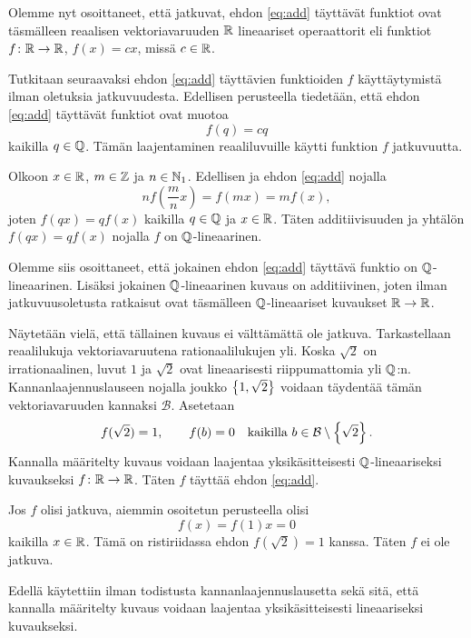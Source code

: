 \documentclass[11pt,a4paper]{amsart}
\begin{document}
\begin{solution}
  Olemme nyt osoittaneet, että jatkuvat, ehdon \eqref{eq:add} täyttävät
  funktiot ovat täsmälleen reaalisen vektoriavaruuden \(\mathbb{R}\)
  lineaariset operaattorit
  eli funktiot \(f \colon \mathbb{R} \to \mathbb{R}\), \(f(x) = cx\), missä \(c \in \mathbb{R}\).

  Tutkitaan seuraavaksi ehdon \eqref{eq:add} täyttävien funktioiden \(f\)
  käyttäytymistä ilman oletuksia jatkuvuudesta. Edellisen perusteella
  tiedetään, että ehdon \eqref{eq:add} täyttävät funktiot ovat muotoa
  \[
    f(q) = cq
  \]
  kaikilla \(q \in \mathbb{Q}\). Tämän laajentaminen reaaliluvuille käytti funktion
  \(f\) jatkuvuutta.

  Olkoon \(x \in \mathbb{R}\), \(m \in \mathbb{Z}\) ja \(n \in \mathbb{N}_1\). Edellisen ja
  ehdon \eqref{eq:add} nojalla
  \[
    nf\left(\frac{m}{n}x\right) = f(mx) = mf(x),
  \]
  joten \(f(qx) = qf(x)\) kaikilla \(q \in \mathbb{Q}\) ja \(x \in \mathbb{R}\).
  Täten additiivisuuden ja yhtälön \(f(qx) = qf(x)\) nojalla
  \(f\) on \(\mathbb{Q}\)-lineaarinen.

  Olemme siis osoittaneet, että jokainen ehdon \eqref{eq:add} täyttävä
  funktio on \(\mathbb{Q}\)-lineaarinen. Lisäksi jokainen \(\mathbb{Q}\)-lineaarinen
  kuvaus on additiivinen, joten ilman jatkuvuusoletusta ratkaisut ovat
  täsmälleen \(\mathbb{Q}\)-lineaariset kuvaukset \(\mathbb{R} \to \mathbb{R}\).

  Näytetään vielä, että tällainen kuvaus ei välttämättä ole jatkuva.
  Tarkastellaan reaalilukuja vektoriavaruutena rationaalilukujen yli.
  Koska \(\sqrt{2}\) on irrationaalinen, luvut \(1\) ja \(\sqrt{2}\)
  ovat lineaarisesti riippumattomia yli \(\mathbb{Q}\):n. Kannanlaajennuslauseen
  nojalla joukko \(\left\lbrace1,\sqrt{2}\right\rbrace\) voidaan täydentää tämän
  vektoriavaruuden kannaksi \(\mathcal{B}\). Asetetaan
  \[
    f(\sqrt{2}) = 1, \qquad
    f(b) = 0 \quad \text{kaikilla } b \in \mathcal{B} \setminus \left\lbrace\sqrt{2}\right\rbrace.
  \]
  Kannalla määritelty kuvaus voidaan laajentaa yksikäsitteisesti
  \(\mathbb{Q}\)-lineaariseksi kuvaukseksi \(f\colon \mathbb{R} \to \mathbb{R}\).
  Täten \(f\) täyttää ehdon \eqref{eq:add}.

  Jos \(f\) olisi jatkuva, aiemmin osoitetun perusteella olisi
  \[
    f(x) = f(1)x = 0
  \]
  kaikilla \(x \in \mathbb{R}\). Tämä on ristiriidassa ehdon
  \(f(\sqrt{2}) = 1\) kanssa. Täten \(f\) ei ole jatkuva.
\end{solution}

\begin{remark}
  Edellä käytettiin ilman todistusta kannanlaajennuslausetta sekä sitä,
  että kannalla määritelty kuvaus voidaan laajentaa yksikäsitteisesti
  lineaariseksi kuvaukseksi.
\end{remark}
\end{document}
